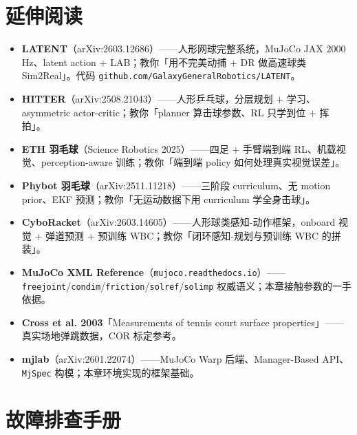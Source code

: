 \section*{延伸阅读}
\label{sec:rlmc-tennis-reading}

\begin{itemize}
  \item \textbf{LATENT}（arXiv:2603.12686）\cite{tennis_latent2026}——人形网球完整系统，MuJoCo JAX $2000$\,Hz、latent action $+$ LAB；教你「用不完美动捕 $+$ DR 做高速球类 Sim2Real」。代码 \verb|github.com/GalaxyGeneralRobotics/LATENT|。
  \item \textbf{HITTER}（arXiv:2508.21043）\cite{tennis_hitter2025}——人形乒乓球，分层规划 $+$ 学习、asymmetric actor-critic；教你「planner 算击球参数、RL 只学到位 $+$ 挥拍」。
  \item \textbf{ETH 羽毛球}（Science Robotics 2025）\cite{tennis_eth2025badminton}——四足 $+$ 手臂端到端 RL、机载视觉、perception-aware 训练；教你「端到端 policy 如何处理真实视觉误差」。
  \item \textbf{Phybot 羽毛球}（arXiv:2511.11218）\cite{tennis_phybot2025}——三阶段 curriculum、无 motion prior、EKF 预测；教你「无运动数据下用 curriculum 学全身击球」。
  \item \textbf{CyboRacket}（arXiv:2603.14605）\cite{tennis_cyboracket2026}——人形球类感知-动作框架，onboard 视觉 $+$ 弹道预测 $+$ 预训练 WBC；教你「闭环感知-规划与预训练 WBC 的拼装」。
  \item \textbf{MuJoCo XML Reference}（\verb|mujoco.readthedocs.io|）\cite{mujoco_docs}——\verb|freejoint|/\verb|condim|/\verb|friction|/\verb|solref|/\verb|solimp| 权威语义；本章接触参数的一手依据。
  \item \textbf{Cross et al. 2003}「Measurements of tennis court surface properties」\cite{cross2003tennis}——真实场地弹跳数据，COR 标定参考。
  \item \textbf{mjlab}（arXiv:2601.22074）\cite{mjlab2026}——MuJoCo Warp 后端、Manager-Based API、\verb|MjSpec| 构模；本章环境实现的框架基础。
\end{itemize}

\section*{故障排查手册}
\label{sec:rlmc-tennis-trouble}

